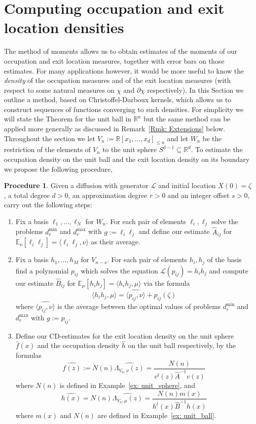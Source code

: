 \documentclass[12pt]{amsart}
\theoremstyle{definition}
\newtheorem{procedure}[lemma]{Procedure}
\renewcommand{\leq}{\leqslant}
\newcommand{\RR}{\ensuremath{\mathbb{R}}}
\newcommand{\EE}{\ensuremath{\mathbb{E}}}
\begin{document}
\section{Computing occupation and exit location densities}

The method of moments allows us to obtain estimates of the moments of our occupation and exit location measures, together with error bars on those estimates. For many applications however, it would be more useful to know the {\it density} of the occupation measures and of the exit location measures (with respect to some natural measures on $\chi$ and $\partial \chi$ respectively). In this Section we outline a method, based on Christoffel-Darboux kernels, which allows us to construct sequences of functions converging to such densities. 
For simplicity we will state the Theorem for the unit ball in $\RR^n$ but the same method can be applied more generally as discussed in Remark~\ref{Rmk: Extensions} below. Throughout the section we let $V_n:=\RR[x_1,\dots, x_d]_{\leq n}$ and let $W_n$ be the restriction of the elements of $V_n$ to the unit sphere $S^{d-1}\subseteq \RR^d$. To estimate the occupation density on the unit ball and the exit location density on its boundary we propose the following procedure,


\begin{procedure}\label{algo} Given a diffusion with generator $\mathcal{L}$ and initial location $X(0)=\zeta$, a total degree $d>0$, an approximation degree $r>0$ and an integer offset $s>0$, carry out the following steps:


\begin{enumerate}
\item Fix a basis $\ell_1,\dots, \ell_{N}$ for $W_n$. For each pair of elements $\ell_i,\ell_j$ solve the problems $d_r^{\min}$ and $d_r^{\max}$ with $g:=\ell_i\ell_j$ and define our estimate $\hat{A}_{ij}$ for $\EE_{\nu}[\ell_i\ell_j]=\langle \ell_i\ell_j,\nu\rangle$ as their average.
\item Fix a basis $h_1,\dots, h_M$ for $V_{n-s}$. For each pair of elements $h_i,h_j$ of the basis find a polynomial $p_{ij}$ which solves the equation $\mathcal{L}(p_{ij})=h_ih_j$ and compute our estimate $\hat{B}_{ij}$ for $\EE_{\mu}[h_ih_j]=\langle h_ih_j,\mu\rangle$ via the formula
\[\langle h_ih_j,\mu\rangle = \widehat{\langle p_{ij},\nu\rangle} + p_{ij}(\zeta)\] 
where $\widehat{\langle p_{ij},\nu\rangle}$ is the average between the optimal values of problems $d_r^{\min}$ and $d_r^{\max}$ with $g:=p_{ij}$.
\item Define our CD-estimates for the exit location density on the unit sphere $\hat{f}(x)$ and the occupation density $\hat{h}$ on the unit ball respectively, by the formulas
\[\widehat{f(z)} := N(n)\widehat{\Lambda_{V_n,\nu}(z)}= \frac{N(n)}{v^t(z) \hat{A}^{-1}v(z)}\]
where $N(n)$ is defined in Example~\ref{ex: unit_sphere}, and
\[\widehat{h(x)} = N(n)\widehat{\Lambda_{V_n,\mu}(z)} = \frac{N(n)m(x)}{h^t(x)\hat{B}^{-1}h(x)}\]
where $m(x)$ and $N(n)$ are defined in Example~\ref{ex: unit_ball}.
\end{enumerate}
\end{procedure}
\end{document}
